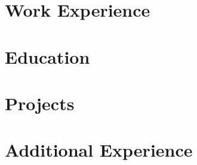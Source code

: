\documentclass[letter,10pt]{article}
\begin{document}


\section{Work Experience}


\section{Education}


\section{Projects}


\section{Additional Experience}

\end{document}
